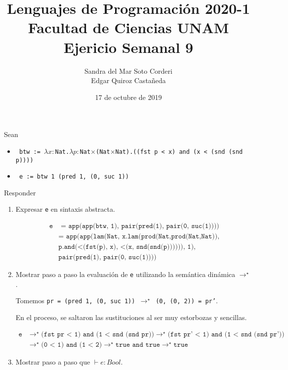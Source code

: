 \documentclass{article}
\title{
    Lenguajes de Programación 2020-1\\
    Facultad de Ciencias UNAM\\
    Ejericio Semanal 9
}
\author{
    Sandra del Mar Soto Corderi\\
    Edgar Quiroz Castañeda
}
\date{
    17 de octubre de 2019
}
\newcommand{\lm}{\lambda}
\newcommand{\x}{\times}
\newcommand{\bx}{\rightarrow^{\star}}
\newcommand{\tx}[1]{\texttt{#1}}
\begin{document}
    \maketitle

    Sean

    \begin{itemize}
        \item \tx{
            btw := $\lm x : $Nat.$\lm p : $Nat$ \x $(Nat$ \x $Nat).((fst p < x)
            and (x < (snd (snd p))))
        }

        \item \tx{
            e := btw 1 (pred 1, (0, suc 1))
        }
    \end{itemize}

    Responder

    \begin{enumerate}
        \item {
            Expresar \tx{e} en sintaxis abstracta.

            \begin{align*}
                \tx{e} &\tx{ = app(app(btw, 1), pair(pred(1), pair(0, suc(1))))}\\
                &\tx{= app(app(lam(Nat, x.lam(prod(Nat,prod(Nat,Nat)),} \\
                &\tx{p.and(<(fst(p), x), <(x, snd(snd(p)))))), 1),}\\
                &\tx{pair(pred(1), pair(0, suc(1))))}
            \end{align*}
        }
        \item {
            Mostrar paso a paso la evaluación de \texttt{e} utilizando la
            semántica dinámica $\bx$.

            Tomemos \tx{pr = (pred 1, (0, suc 1)) $\bx$ (0, (0, 2)) = pr'}. 

            En el proceso, se saltaron las sustituciones al ser muy estorbozas
            y sencillas.

            \begin{align*}
                \tx{e} &\bx \tx{(fst pr < 1) and (1 < snd (snd pr))}
                \bx \tx{(fst pr' < 1) and (1 < snd (snd pr'))} \\
                &\bx \tx{(0 < 1) and (1 < 2)} \bx \tx{true and true} \bx 
                \tx{true}
            \end{align*}
        }
        \item {
            Mostrar paso a paso que $\vdash e : Bool$.

}
\end{enumerate}
\end{document}
